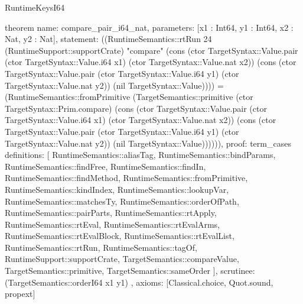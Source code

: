 \begin{lexlean}{RuntimeKeysI64}
\begin{semanticmodule}
theorem{
  name: compare_pair_i64_nat,
  parameters: [x1 : Int64, y1 : Int64, x2 : Nat, y2 : Nat],
  statement: ((RuntimeSemantics::rtRun 24 (RuntimeSupport::supportCrate) "compare" (cons (ctor TargetSyntax::Value.pair (ctor TargetSyntax::Value.i64 x1) (ctor TargetSyntax::Value.nat x2)) (cons (ctor TargetSyntax::Value.pair (ctor TargetSyntax::Value.i64 y1) (ctor TargetSyntax::Value.nat y2)) (nil TargetSyntax::Value)))) = (RuntimeSemantics::fromPrimitive (TargetSemantics::primitive (ctor TargetSyntax::Prim.compare) (cons (ctor TargetSyntax::Value.pair (ctor TargetSyntax::Value.i64 x1) (ctor TargetSyntax::Value.nat x2)) (cons (ctor TargetSyntax::Value.pair (ctor TargetSyntax::Value.i64 y1) (ctor TargetSyntax::Value.nat y2)) (nil TargetSyntax::Value)))))),
  proof: term_cases{
    definitions: [
      RuntimeSemantics::aliasTag,
      RuntimeSemantics::bindParams,
      RuntimeSemantics::findFree,
      RuntimeSemantics::findIn,
      RuntimeSemantics::findMethod,
      RuntimeSemantics::fromPrimitive,
      RuntimeSemantics::kindIndex,
      RuntimeSemantics::lookupVar,
      RuntimeSemantics::matchesTy,
      RuntimeSemantics::orderOfPath,
      RuntimeSemantics::pairParts,
      RuntimeSemantics::rtApply,
      RuntimeSemantics::rtEval,
      RuntimeSemantics::rtEvalArms,
      RuntimeSemantics::rtEvalBlock,
      RuntimeSemantics::rtEvalList,
      RuntimeSemantics::rtRun,
      RuntimeSemantics::tagOf,
      RuntimeSupport::supportCrate,
      TargetSemantics::compareValue,
      TargetSemantics::primitive,
      TargetSemantics::sameOrder
    ],
    scrutinee: (TargetSemantics::orderI64 x1 y1)
  },
  axioms: [Classical.choice, Quot.sound, propext]
}


\end{semanticmodule}
\end{lexlean}
